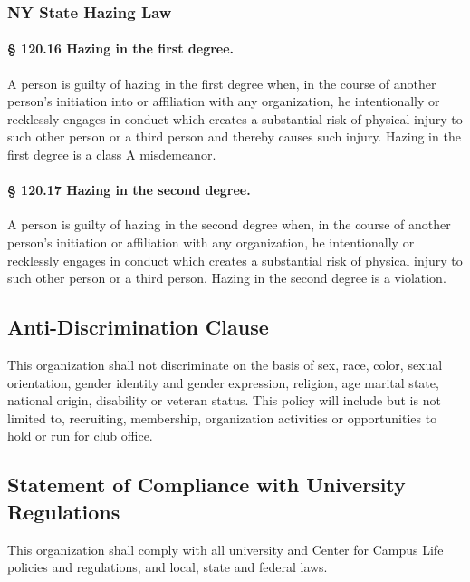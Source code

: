 \documentclass{article}
\newcommand{\asection}[1]{\subsection{#1} \label{#1}}
\newcommand{\asubsection}[1]{\subsubsection{#1} \label{#1}}
\newcommand{\asubsubsection}[1]{\paragraph{#1} \label{#1}}
\begin{document}
\asubsection{NY State Hazing Law}

\asubsubsection{§ 120.16 Hazing in the first degree.}
A person is guilty of hazing in the first degree when, in the course of
another person's initiation into or affiliation with any organization, he intentionally or recklessly engages in
conduct which creates a substantial risk of physical injury to such other person or a third person and thereby
causes such injury. Hazing in the first degree is a class A misdemeanor.

\asubsubsection{§ 120.17 Hazing in the second degree.}
A person is guilty of hazing in the second degree when, in the course of another person's initiation or affiliation with any organization, he intentionally or recklessly engages in conduct which creates a substantial risk of physical injury to such other person or a third person.
Hazing in the second degree is a violation.

\asection{Anti-Discrimination Clause}
This organization shall not discriminate on the basis of sex, race, color, sexual orientation, gender identity and gender expression, religion, age marital state, national origin, disability or veteran status.
This policy will include but is not limited to, recruiting, membership, organization activities or opportunities to hold or run for club office.

\asection{Statement of Compliance with University Regulations}
This organization shall comply with all university and Center for Campus Life policies and regulations, and local, state and federal laws.
\end{document}
